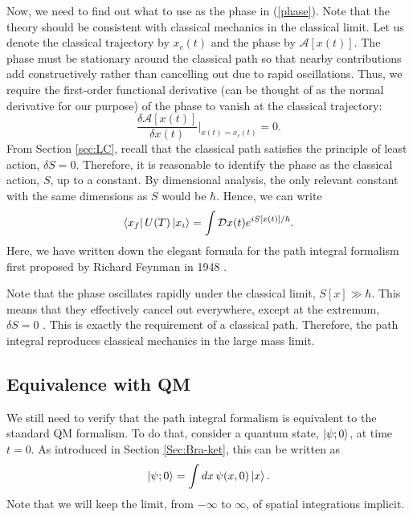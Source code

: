 \documentclass[12pt,a4paper]{article}
\begin{document}
Now, we need to find out what to use as the phase in (\ref{phase}). Note that the theory should be consistent with classical mechanics in the classical limit. Let us denote the classical trajectory by $x_c(t)$ and the phase by $\mathcal{A}[x(t)]$. The phase must be stationary around the classical path so that nearby contributions add constructively rather than cancelling out due to rapid oscillations. Thus, we require the first-order functional derivative (can be thought of as the normal derivative for our purpose) of the phase to vanish at the classical trajectory:
\begin{equation}
    \frac{\delta\mathcal{A}[x(t)]}{\delta x(t)}\bigg|_{x(t)=x_c(t)} = 0.
\end{equation}
From Section \ref{sec:LC}, recall that the classical path satisfies the principle of least action, $\delta S = 0$. Therefore, it is reasonable to identify the phase as the classical action, $S$, up to a constant. By dimensional analysis, the only relevant constant with the same dimensions as $S$ would be $\hbar$. Hence, we can write
\begin{equation}
    \bra{x_f}U(T)\ket{x_i} = \int \mathcal{D}x(t) e^{iS[x(t)]/\hbar}.
    \label{PI}
\end{equation}
Here, we have written down the elegant formula for the path integral formalism first proposed by Richard Feynman in 1948 \cite{Feynman1948, Peskin, TongQM}.

Note that the phase oscillates rapidly under the classical limit, $S[x]\gg\hbar$. This means that they effectively cancel out everywhere, except at the extremum, $\delta S = 0$ \cite{TongQM, Schwartz}. This is exactly the requirement of a classical path. Therefore, the path integral reproduces classical mechanics in the large mass limit.

\subsection{Equivalence with QM}
We still need to verify that the path integral formalism is equivalent to the standard QM formalism.
To do that, consider a quantum state, $\ket{\psi;0}$, at time $t=0$. As introduced in Section \ref{Sec:Bra-ket}, this can be written as
\begin{equation}
    \ket{\psi;0} = \int dx\, \psi(x,0) \ket{x}.
    \label{expan}
\end{equation}
Note that we will keep the limit, from $-\infty$ to $\infty$, of spatial integrations implicit. 
\end{document}
